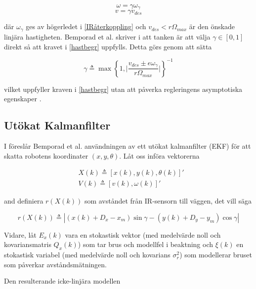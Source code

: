 \documentclass[11pt]{article}
\begin{document}
\begin{flushleft}
\begin{equation}
	\omega = \gamma \omega_\gamma
\end{equation}
\begin{equation}
	v = \gamma v_{des}
\end{equation}

där $\omega_\gamma$ ges av högerledet i \eqref{IRåterkoppling} och $v_{des} < r \Omega_{max}$ är den önskade linjära hastigheten. Bemporad et al. skriver i \cite{wfp} att tanken är att välja $\gamma \in [0,1]$ direkt så att kravet i \eqref{hastbegr} uppfylls. Detta görs genom att sätta

\begin{equation}\label{haståterkoppling}
	\gamma \triangleq \max{\left\{ 1, \bigg| \frac {v_{des} \pm e \omega_\gamma} {r \Omega_{max}} \bigg|  \right\}}^{-1}
\end{equation}

vilket uppfyller kraven i \eqref{hastbegr} utan att påverka regleringens asymptotiska egenskaper \cite{wfp}.

\subsection{Utökat Kalmanfilter}
I \cite{wfp} föreslår Bemporad et al. användningen av ett utökat kalmanfilter (EKF) för att skatta robotens koordinater $(x,y,\theta)$. Låt oss införa vektorerna 

\begin{equation*}
	\begin{aligned}
	&X(k) \triangleq [x(k), y(k), \theta(k)]' \\
	&V(k) \triangleq [v(k), \omega(k)]'
	\end{aligned}
\end{equation*}

and definiera $r(X(k))$ som avståndet från IR-sensorn till väggen, det vill säga

\begin{equation*}
	r(X(k)) \triangleq | (x(k) + D_x - x_m) \sin \gamma - (y(k) + D_y - y_m) \cos \gamma |
\end{equation*}

Vidare, låt $E_x(k)$ vara en stokastisk vektor (med medelvärde noll och kovariansmatris $Q_x(k)$) som tar brus och modellfel i beaktning och $\xi(k)$ en stokastisk variabel (med medelvärde noll och kovarians $\sigma_r^2$) som modellerar bruset som påverkar avståndsmätningen.

Den resulterande icke-linjära modellen 


\end{flushleft}
\end{document}
